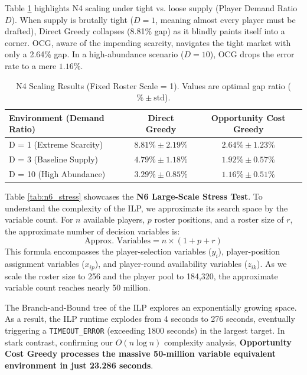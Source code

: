 \documentclass[11pt,a4paper]{article}
\begin{document}
Table \ref{tab:n4} highlights N4 scaling under tight vs. loose supply (Player Demand Ratio $D$). When supply is brutally tight ($D=1$, meaning almost every player must be drafted), Direct Greedy collapses (8.81\% gap) as it blindly paints itself into a corner. OCG, aware of the impending scarcity, navigates the tight market with only a 2.64\% gap. In a high-abundance scenario ($D=10$), OCG drops the error rate to a mere $1.16\%$.

\begin{table}[H]
\centering
\caption{N4 Scaling Results (Fixed Roster Scale = 1). Values are optimal gap ratio ($\% \pm \text{std}$).}
\label{tab:n4}
\begin{tabular}{lcc}
\toprule
Environment (Demand Ratio) & Direct Greedy & Opportunity Cost Greedy \\
\midrule
D = 1 (Extreme Scarcity) & $8.81\% \pm 2.19\%$ & $\mathbf{2.64\% \pm 1.23\%}$ \\
D = 3 (Baseline Supply) & $4.79\% \pm 1.18\%$ & $1.92\% \pm 0.57\%$ \\
D = 10 (High Abundance) & $3.29\% \pm 0.85\%$ & $\mathbf{1.16\% \pm 0.51\%}$ \\
\bottomrule
\end{tabular}
\end{table}

Table \ref{tab:n6_stress} showcases the \textbf{N6 Large-Scale Stress Test}. To understand the complexity of the ILP, we approximate its search space by the variable count. For $n$ available players, $p$ roster positions, and a roster size of $r$, the approximate number of decision variables is:
\[ \text{Approx. Variables} = n \times (1 + p + r) \]
This formula encompasses the player-selection variables ($y_i$), player-position assignment variables ($x_{ip}$), and player-round availability variables ($z_{ik}$). As we scale the roster size to 256 and the player pool to 184,320, the approximate variable count reaches nearly 50 million.

The Branch-and-Bound tree of the ILP explores an exponentially growing space. As a result, the ILP runtime explodes from 4 seconds to 276 seconds, eventually triggering a \texttt{TIMEOUT\_ERROR} (exceeding 1800 seconds) in the largest target. In stark contrast, confirming our $O(n \log n)$ complexity analysis, \textbf{Opportunity Cost Greedy processes the massive 50-million variable equivalent environment in just 23.286 seconds}.
\end{document}
